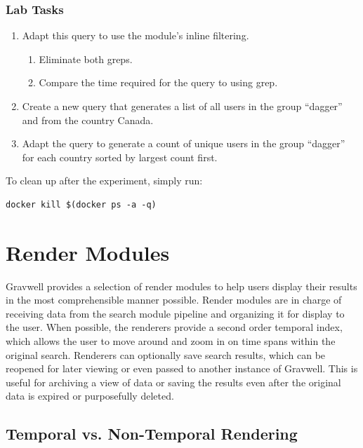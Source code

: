 \subsubsection{Lab Tasks}

\begin{enumerate}
\item
  Adapt this query to use the  module's inline filtering.
	\begin{enumerate}
	\item Eliminate both greps.
	\item Compare the time required for the query to using grep.
	\end{enumerate}
\item
  Create a new query that generates a list of all users in the group
  ``dagger'' and from the country Canada.
\item
  Adapt the query to generate a count of unique users in the
  group ``dagger'' for each country sorted by largest count first.
\end{enumerate}

To clean up after the experiment, simply run:

\begin{Verbatim}[breaklines=true]
docker kill $(docker ps -a -q)
\end{Verbatim}






\section{Render Modules}

Gravwell provides a selection of render modules to help users display
their results in the most comprehensible manner possible. Render modules
are in charge of receiving data from the search module pipeline and
organizing it for display to the user. When possible, the renderers
provide a second order temporal index, which allows the user to move
around and zoom in on time spans within the original search. Renderers
can optionally save search results, which can be reopened for later
viewing or even passed to another instance of Gravwell. This is useful
for archiving a view of data or saving the results even after the
original data is expired or purposefully deleted.

\subsection{Temporal vs. Non-Temporal Rendering}

